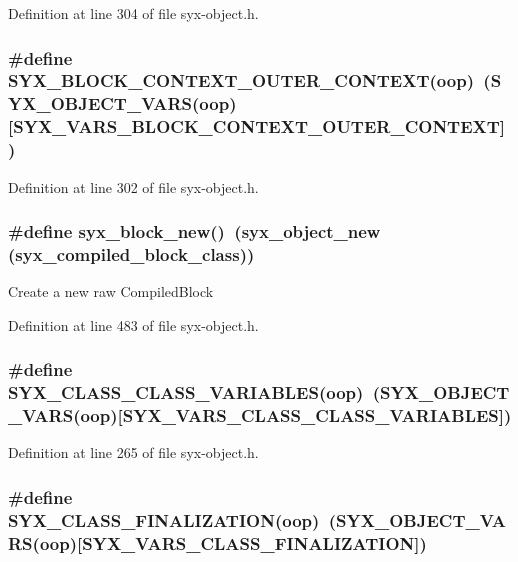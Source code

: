 Definition at line 304 of file syx-object.h.\hypertarget{syx-object_8h_901ec826ea0223727b4271aed6242876}{
\subsubsection{\setlength{\rightskip}{0pt plus 5cm}\#define SYX\_\-BLOCK\_\-CONTEXT\_\-OUTER\_\-CONTEXT(oop)~(SYX\_\-OBJECT\_\-VARS(oop)\mbox{[}SYX\_\-VARS\_\-BLOCK\_\-CONTEXT\_\-OUTER\_\-CONTEXT\mbox{]})}}
\label{syx-object_8h_901ec826ea0223727b4271aed6242876}




Definition at line 302 of file syx-object.h.\hypertarget{syx-object_8h_eac6ccd66510e9bee47fc73dc7022e57}{
\subsubsection{\setlength{\rightskip}{0pt plus 5cm}\#define syx\_\-block\_\-new()~(syx\_\-object\_\-new ({\bf syx\_\-compiled\_\-block\_\-class}))}}
\label{syx-object_8h_eac6ccd66510e9bee47fc73dc7022e57}


Create a new raw CompiledBlock 

Definition at line 483 of file syx-object.h.\hypertarget{syx-object_8h_53a52a78223a9b7b0e41326bb85500d7}{
\subsubsection{\setlength{\rightskip}{0pt plus 5cm}\#define SYX\_\-CLASS\_\-CLASS\_\-VARIABLES(oop)~(SYX\_\-OBJECT\_\-VARS(oop)\mbox{[}SYX\_\-VARS\_\-CLASS\_\-CLASS\_\-VARIABLES\mbox{]})}}
\label{syx-object_8h_53a52a78223a9b7b0e41326bb85500d7}




Definition at line 265 of file syx-object.h.\hypertarget{syx-object_8h_fc8cf8d7967541cd3bc7c5e15cbb33ea}{
\subsubsection{\setlength{\rightskip}{0pt plus 5cm}\#define SYX\_\-CLASS\_\-FINALIZATION(oop)~(SYX\_\-OBJECT\_\-VARS(oop)\mbox{[}SYX\_\-VARS\_\-CLASS\_\-FINALIZATION\mbox{]})}}
\label{syx-object_8h_fc8cf8d7967541cd3bc7c5e15cbb33ea}




